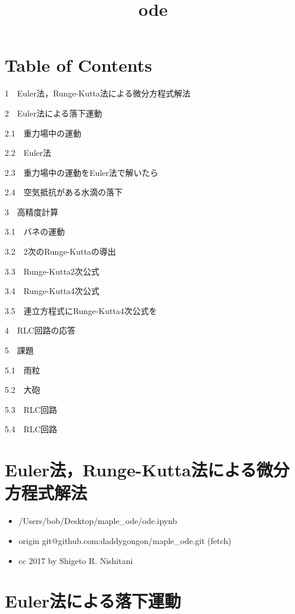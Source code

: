 \documentclass[11pt,dvipdfmx]{jsarticle}
\title{ode}
\providecommand{\tightlist}{%
      \setlength{\itemsep}{0pt}\setlength{\parskip}{0pt}}
\begin{document}
    
    
    \maketitle
    
    

    
    \section{Table of Contents}\label{table-of-contents}

{1~~}Euler法，Runge-Kutta法による微分方程式解法

{2~~}Euler法による落下運動

{2.1~~}重力場中の運動

{2.2~~}Euler法

{2.3~~}重力場中の運動をEuler法で解いたら

{2.4~~}空気抵抗がある水滴の落下

{3~~}高精度計算

{3.1~~}バネの運動

{3.2~~}2次のRunge-Kuttaの導出

{3.3~~}Runge-Kutta2次公式

{3.4~~}Runge-Kutta4次公式

{3.5~~}連立方程式にRunge-Kutta4次公式を

{4~~}RLC回路の応答

{5~~}課題

{5.1~~}雨粒

{5.2~~}大砲

{5.3~~}RLC回路

{5.4~~}RLC回路

    \section{Euler法，Runge-Kutta法による微分方程式解法}\label{eulerux6cd5runge-kuttaux6cd5ux306bux3088ux308bux5faeux5206ux65b9ux7a0bux5f0fux89e3ux6cd5}

\begin{itemize}
\tightlist
\item
  /Users/bob/Desktop/maple\_ode/ode.ipynb
\item
  origin git@github.com:daddygongon/maple\_ode.git (fetch)
\item
  cc 2017 by Shigeto R. Nishitani
\end{itemize}

    \section{Euler法による落下運動}\label{eulerux6cd5ux306bux3088ux308bux843dux4e0bux904bux52d5}
\end{document}
